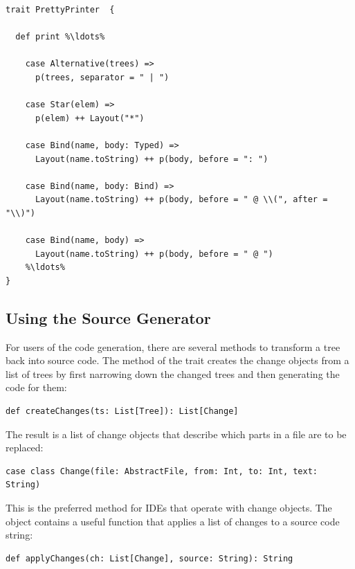 \label{listing:pretty-printer}
\begin{lstlisting}
trait PrettyPrinter  {
  
  def print %\ldots%  

    case Alternative(trees) =>
      p(trees, separator = " | ")
      
    case Star(elem) =>
      p(elem) ++ Layout("*")
      
    case Bind(name, body: Typed) =>
      Layout(name.toString) ++ p(body, before = ": ")

    case Bind(name, body: Bind) =>
      Layout(name.toString) ++ p(body, before = " @ \\(", after = "\\)")
      
    case Bind(name, body) =>
      Layout(name.toString) ++ p(body, before = " @ ")
    %\ldots%
}
\end{lstlisting}

\subsection{Using the Source Generator}

For users of the code generation, there are several methods to transform a tree back into source code. The  method of the  trait creates the change objects from a list of trees by first narrowing down the changed trees and then generating the code for them:

\begin{lstlisting}
def createChanges(ts: List[Tree]): List[Change]
\end{lstlisting}

The result is a list of change objects that describe which parts in a file are to be replaced:

\begin{lstlisting}
case class Change(file: AbstractFile, from: Int, to: Int, text: String)
\end{lstlisting}

This is the preferred method for IDEs that operate with change objects. The  object contains a useful function that applies a list of changes to a source code string:

\begin{lstlisting}
def applyChanges(ch: List[Change], source: String): String
\end{lstlisting}


